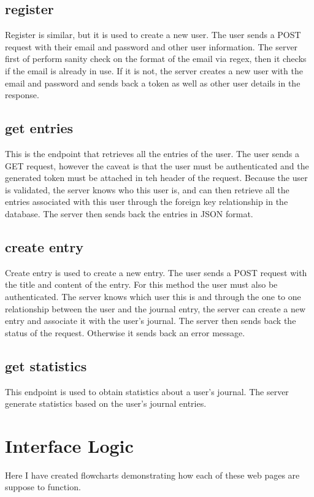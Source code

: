 \subsection{register}
Register is similar, but it is used to create a new user. The user sends a POST request with their email and password and other user information. The server first of perform sanity check on the format of the email via regex, then it checks if the email is already in use. If it is not, the server creates a new user with the email and password and sends back a token as well as other user details in the response.


\subsection{get entries}
This is the endpoint that retrieves all the entries of the user. The user sends a GET request, however the caveat is that the user must be authenticated and the generated token must be attached in teh header of the request. Because the user is validated, the server knows who this user is, and can then retrieve all the entries associated with this user through the foreign key relationship in the database. The server then sends back the entries in JSON format.

\subsection{create entry}
Create entry is used to create a new entry. The user sends a POST request with the title and content of the entry. For this method the user must also be authenticated. The server knows which user this is and through the one to one relationship between the user and the journal entry, the server can create a new entry and associate it with the user's journal. The server then sends back the status of the request. Otherwise it sends back an error message.

\subsection{get statistics}
This endpoint is used to obtain statistics about a user's journal. The server generate statistics based on the user's journal entries. 

\section{Interface Logic}
Here I have created flowcharts demonstrating how each of these web pages are suppose to function.


